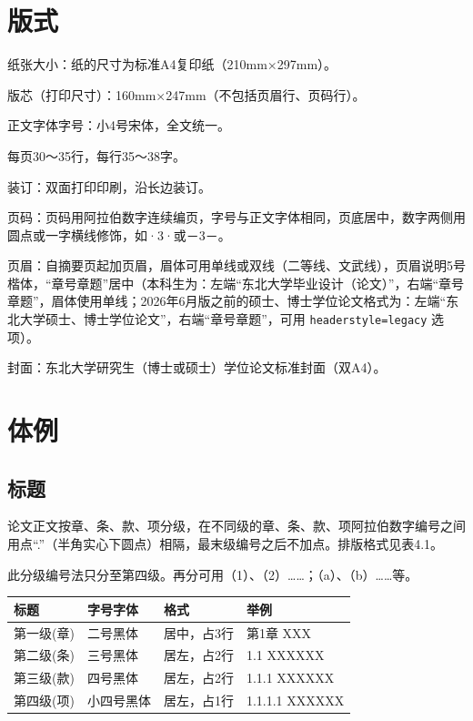 \section{版式}
纸张大小：纸的尺寸为标准A4复印纸（210mm×297mm）。

版芯（打印尺寸）：160mm×247mm（不包括页眉行、页码行）。

正文字体字号：小4号宋体，全文统一。

每页30～35行，每行35～38字。

装订：双面打印印刷，沿长边装订。

页码：页码用阿拉伯数字连续编页，字号与正文字体相同，页底居中，数字两侧用圆点或一字横线修饰，如·3·或－3－。

页眉：自摘要页起加页眉，眉体可用单线或双线（二等线、文武线），页眉说明5号楷体，“章号章题”居中（本科生为：左端“东北大学毕业设计（论文）”，右端“章号章题”，眉体使用单线；2026年6月版之前的硕士、博士学位论文格式为：左端“东北大学硕士、博士学位论文”，右端“章号章题”，可用 \texttt{headerstyle=legacy} 选项）。

封面：东北大学研究生（博士或硕士）学位论文标准封面（双A4）。

\section{体例}

\subsection{标题}

论文正文按章、条、款、项分级，在不同级的章、条、款、项阿拉伯数字编号之间用点“.”（半角实心下圆点）相隔，最末级编号之后不加点。排版格式见表4.1。

此分级编号法只分至第四级。再分可用（1）、（2）……；（a）、（b）……等。

\begin{table}[htpb]
    \begin{center}
        \begin{tabular}{|l | l | l | l |}
            \hline
            标题       & 字号字体   & 格式        & 举例           \\
            \hline
            第一级(章) & 二号黑体   & 居中，占3行 & 第1章 XXX      \\
            \hline
            第二级(条) & 三号黑体   & 居左，占2行 & 1.1 XXXXXX     \\
            \hline
            第三级(款) & 四号黑体   & 居左，占2行 & 1.1.1 XXXXXX   \\
            \hline
            第四级(项) & 小四号黑体 & 居左，占1行 & 1.1.1.1 XXXXXX \\
            \hline
        \end{tabular}
    \end{center}
\end{table}

